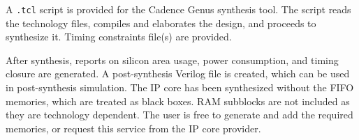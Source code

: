 %

A \texttt{.tcl} script is provided for the Cadence Genus synthesis tool. The script
reads the technology files, compiles and elaborates the design, and proceeds to
synthesize it. Timing constraints file(s) are provided.

After synthesis, reports on silicon area usage, power consumption, and timing
closure are generated. A post-synthesis Verilog file is created, which can be
used in post-synthesis simulation. The IP core has been synthesized without the
FIFO memories, which are treated as black boxes. RAM subblocks are not included as
they are technology dependent. The user is free to generate and add the required
memories, or request this service from the IP core provider.


